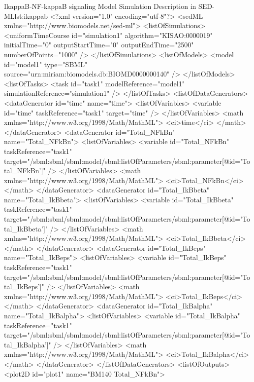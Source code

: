 \footnotesize
\begin{myXmlLst}{IkappaB-NF-kappaB signaling Model Simulation Description in SED-ML}{lst:ikappab}
<?xml version="1.0" encoding="utf-8"?>
<sedML xmlns="http://www.biomodels.net/sed-ml">
  <listOfSimulations>
    <uniformTimeCourse id="simulation1" algorithm="KISAO:0000019"
    initialTime="0" outputStartTime="0" outputEndTime="2500"
    numberOfPoints="1000" />
  </listOfSimulations>
  <listOfModels>
    <model id="model1" type="SBML" source="urn:miriam:biomodels.db:BIOMD0000000140" />
  </listOfModels>
  <listOfTasks>
    <task id="task1" modelReference="model1"
    simulationReference="simulation1" />
  </listOfTasks>
  <listOfDataGenerators>
    <dataGenerator id="time" name="time">
      <listOfVariables>
        <variable id="time" taskReference="task1" target="time" />
      </listOfVariables>
      <math xmlns="http://www.w3.org/1998/Math/MathML">
        <ci>time</ci>
      </math>
    </dataGenerator>
    <dataGenerator id="Total_NFkBn" name="Total_NFkBn">
      <listOfVariables>
        <variable id="Total_NFkBn" taskReference="task1"
        target="/sbml:sbml/sbml:model/sbml:listOfParameters/sbml:parameter[@id='Total_NFkBn']" />
      </listOfVariables>
      <math xmlns="http://www.w3.org/1998/Math/MathML">
        <ci>Total_NFkBn</ci>
      </math>
    </dataGenerator>
    <dataGenerator id="Total_IkBbeta" name="Total_IkBbeta">
      <listOfVariables>
        <variable id="Total_IkBbeta" taskReference="task1"
        target="/sbml:sbml/sbml:model/sbml:listOfParameters/sbml:parameter[@id='Total_IkBbeta']" />
      </listOfVariables>
      <math xmlns="http://www.w3.org/1998/Math/MathML">
        <ci>Total_IkBbeta</ci>
      </math>
    </dataGenerator>
    <dataGenerator id="Total_IkBeps" name="Total_IkBeps">
      <listOfVariables>
        <variable id="Total_IkBeps" taskReference="task1"
        target="/sbml:sbml/sbml:model/sbml:listOfParameters/sbml:parameter[@id='Total_IkBeps']" />
      </listOfVariables>
      <math xmlns="http://www.w3.org/1998/Math/MathML">
        <ci>Total_IkBeps</ci>
      </math>
    </dataGenerator>
    <dataGenerator id="Total_IkBalpha" name="Total_IkBalpha">
      <listOfVariables>
        <variable id="Total_IkBalpha" taskReference="task1"
        target="/sbml:sbml/sbml:model/sbml:listOfParameters/sbml:parameter[@id='Total_IkBalpha']" />
      </listOfVariables>
      <math xmlns="http://www.w3.org/1998/Math/MathML">
        <ci>Total_IkBalpha</ci>
      </math>
    </dataGenerator>
  </listOfDataGenerators>
  <listOfOutputs>
    <plot2D id="plot1" name="BM140 Total_NFkBn">

\end{myXmlLst}

